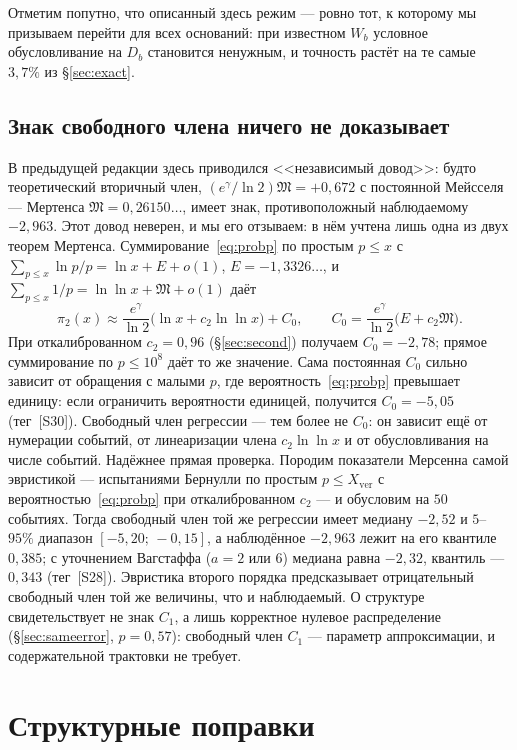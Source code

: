 \documentclass[11pt,a4paper]{article}
\theoremstyle{plain}
\theoremstyle{remark}
\newcommand{\eg}{e^{\gamma}}
\begin{document}
Отметим попутно, что описанный здесь режим --- ровно тот, к которому мы призываем
перейти для всех оснований: при известном $W_b$ условное обусловливание на $D_b$
становится ненужным, и точность растёт на те самые $3{,}7\%$ из \S\ref{sec:exact}.

\subsection{Знак свободного члена ничего не доказывает}

В предыдущей редакции здесь приводился <<независимый довод>>: будто теоретический
вторичный член, $(\eg/\ln2)\mathfrak M=+0{,}672$ с постоянной Мейсселя ---
Мертенса $\mathfrak M=0{,}26150\ldots$, имеет знак, противоположный наблюдаемому
$-2{,}963$. Этот довод неверен, и мы его отзываем: в нём учтена лишь одна из двух
теорем Мертенса. Суммирование~\eqref{eq:probp} по простым $p\le x$ с
$\sum_{p\le x}\ln p/p=\ln x+E+o(1)$, $E=-1{,}3326\ldots$, и
$\sum_{p\le x}1/p=\ln\ln x+\mathfrak M+o(1)$ даёт
\[
\pi_2(x)\approx\frac{\eg}{\ln2}\bigl(\ln x+c_2\ln\ln x\bigr)+C_0,\qquad
C_0=\frac{\eg}{\ln2}\bigl(E+c_2\mathfrak M\bigr).
\]
При откалиброванном $c_2=0{,}96$ (\S\ref{sec:second}) получаем $C_0=-2{,}78$; прямое
суммирование по $p\le10^8$ даёт то же значение. Сама постоянная $C_0$ сильно
зависит от обращения с малыми $p$, где вероятность~\eqref{eq:probp} превышает
единицу: если ограничить вероятности единицей, получится $C_0=-5{,}05$ (тег~[S30]).
Свободный член регрессии --- тем более не $C_0$: он зависит ещё от нумерации
событий, от линеаризации члена $c_2\ln\ln x$ и от обусловливания на числе событий.
Надёжнее прямая проверка. Породим показатели Мерсенна самой
эвристикой --- испытаниями Бернулли по простым $p\le X_{\mathrm{ver}}$ с
вероятностью~\eqref{eq:probp} при откалиброванном $c_2$ --- и обусловим на $50$
событиях. Тогда свободный член той же регрессии имеет медиану $-2{,}52$ и
$5$--$95\%$ диапазон $[-5{,}20;\,-0{,}15]$, а наблюдённое $-2{,}963$ лежит на его
квантиле $0{,}385$; с уточнением Вагстаффа ($a=2$ или $6$) медиана равна $-2{,}32$,
квантиль --- $0{,}343$ (тег~[S28]). Эвристика второго порядка предсказывает
отрицательный свободный член той же величины, что и наблюдаемый. О структуре
свидетельствует не знак $C_1$, а лишь корректное нулевое распределение
(\S\ref{sec:sameerror}, $p=0{,}57$): свободный член $C_1$ --- параметр
аппроксимации, и содержательной трактовки не требует.

\section{Структурные поправки}\label{sec:struct}
\end{document}
